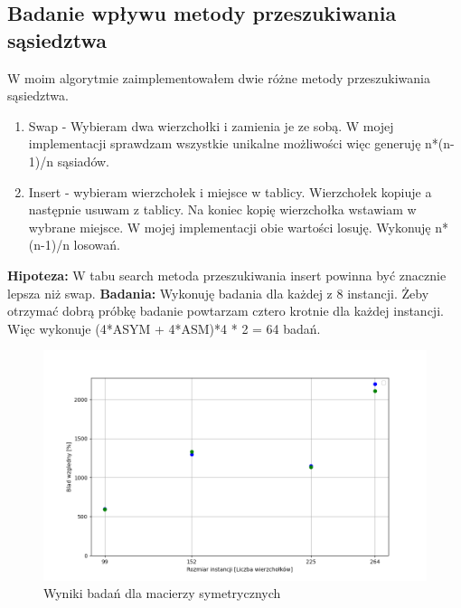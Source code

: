 \documentclass{article}
\begin{document}
      \subsection{Badanie wpływu metody przeszukiwania sąsiedztwa}
        W moim algorytmie zaimplementowałem dwie różne metody przeszukiwania sąsiedztwa.
        \begin{enumerate}
          \item Swap - Wybieram dwa wierzchołki i zamienia je ze sobą. W mojej implementacji
          sprawdzam wszystkie unikalne możliwości więc generuję n*(n-1)/n sąsiadów.
          \item Insert - wybieram wierzchołek i miejsce w tablicy. Wierzchołek kopiuje a następnie 
          usuwam z tablicy. Na koniec kopię wierzchołka wstawiam w wybrane miejsce. W mojej 
          implementacji obie wartości losuję. Wykonuję n*(n-1)/n losowań.
        \end{enumerate}
        \textbf{Hipoteza: } W tabu search metoda przeszukiwania insert powinna być znacznie lepsza
        niż swap.\linebreak
        \textbf{Badania: } Wykonuję badania dla każdej z 8 instancji. Żeby otrzymać dobrą próbkę 
        badanie powtarzam cztero krotnie dla każdej instancji. Więc wykonuje (4*ASYM + 4*ASM)*4 * 2 = 64
        badań. \linebreak
        \FloatBarrier
        
        \FloatBarrier
        \begin{figure}[ht]
          \centering
          \includegraphics[width=\textwidth]{src/plots/symAnNeigMet.png}
          \caption{Wyniki badań dla macierzy symetrycznych}
          \label{fig:symAnNeig}
        \end{figure}
\end{document}
